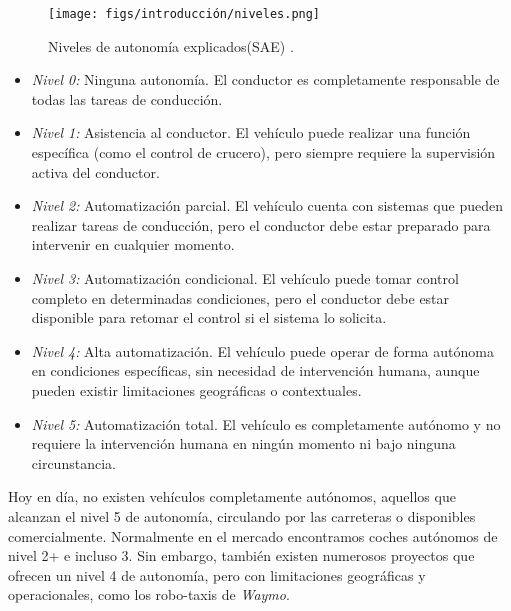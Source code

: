 \newpage

\begin{figure} [ht]
\begin{center}
\texttt{[image: figs/introducción/niveles.png]}
\end{center}
\caption{Niveles de autonomía explicados(\ac{SAE}) \cite{autobild-autonomous}.}
\label{aut-levels}
\end{figure}

\begin{itemize}
\item \textit{Nivel 0:} Ninguna autonomía. El conductor es completamente responsable de todas las tareas de conducción.
\item \textit{Nivel 1:} Asistencia al conductor. El vehículo puede realizar una función específica (como el control de crucero), pero siempre requiere la supervisión activa del conductor.
\item \textit{Nivel 2:} Automatización parcial. El vehículo cuenta con sistemas que pueden realizar tareas de conducción, pero el conductor debe estar preparado para intervenir en cualquier momento.
\item \textit{Nivel 3:} Automatización condicional. El vehículo puede tomar control completo en determinadas condiciones, pero el conductor debe estar disponible para retomar el control si el sistema lo solicita.
\item \textit{Nivel 4:} Alta automatización. El vehículo puede operar de forma autónoma en condiciones específicas, sin necesidad de intervención humana, aunque pueden existir limitaciones geográficas o contextuales.
\item \textit{Nivel 5:} Automatización total. El vehículo es completamente autónomo y no requiere la intervención humana en ningún momento ni bajo ninguna circunstancia.
\end{itemize}

Hoy en día, no existen vehículos completamente autónomos, aquellos que alcanzan el nivel 5 de autonomía, circulando por las carreteras o disponibles comercialmente. Normalmente en el mercado encontramos coches autónomos de nivel 2+ e incluso 3. Sin embargo, también existen numerosos proyectos que ofrecen un nivel 4 de autonomía, pero con limitaciones geográficas y operacionales, como los robo-taxis de \textit{Waymo}.

